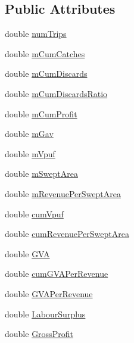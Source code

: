 \subsection*{Public Attributes}
\begin{DoxyCompactItemize}
\item 
double \mbox{\hyperlink{class_harbour_stats_a97f1ef12ab2cb909165335a33cb02ff0}{num\+Trips}}
\item 
double \mbox{\hyperlink{class_harbour_stats_a17bea625b4ffeec45cea7756878d5660}{m\+Cum\+Catches}}
\item 
double \mbox{\hyperlink{class_harbour_stats_adfa3f252a06931fec867835f0ee00db9}{m\+Cum\+Discards}}
\item 
double \mbox{\hyperlink{class_harbour_stats_ae9043cc315f717bbe648116ca271cec2}{m\+Cum\+Discards\+Ratio}}
\item 
double \mbox{\hyperlink{class_harbour_stats_a5fa0daf5d10139ad35496b033c71e65d}{m\+Cum\+Profit}}
\item 
double \mbox{\hyperlink{class_harbour_stats_a2595f623bc9500cd0c64a54ac91a44e0}{m\+Gav}}
\item 
double \mbox{\hyperlink{class_harbour_stats_a8e4c7da92e0fd992c6dd2011171466ad}{m\+Vpuf}}
\item 
double \mbox{\hyperlink{class_harbour_stats_a802d76fb036de39280165975d522e7e3}{m\+Swept\+Area}}
\item 
double \mbox{\hyperlink{class_harbour_stats_a8e72f0f55c7b73e08d57706d74488d96}{m\+Revenue\+Per\+Swept\+Area}}
\item 
double \mbox{\hyperlink{class_harbour_stats_acbce02861cd8b4c9ffb62c359c69ef8d}{cum\+Vpuf}}
\item 
double \mbox{\hyperlink{class_harbour_stats_a518c903ff99394cfe11484935debc0d2}{cum\+Revenue\+Per\+Swept\+Area}}
\item 
double \mbox{\hyperlink{class_harbour_stats_a51ec8bb04898a1deda1c76fe9ebfb7a5}{G\+VA}}
\item 
double \mbox{\hyperlink{class_harbour_stats_ac5858eb1b7d21087b2c547021feaf629}{cum\+G\+V\+A\+Per\+Revenue}}
\item 
double \mbox{\hyperlink{class_harbour_stats_a51d9fb2e2d4b9a92d9eabcf8303d0e73}{G\+V\+A\+Per\+Revenue}}
\item 
double \mbox{\hyperlink{class_harbour_stats_a855d789bca08d730a32901e9d1b16992}{Labour\+Surplus}}
\item 
double \mbox{\hyperlink{class_harbour_stats_a88e59b866a2698f66f337c02c7008c46}{Gross\+Profit}}
\item 

\end{DoxyCompactItemize}
